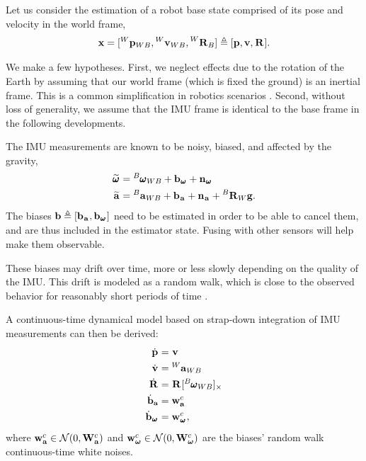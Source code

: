 Let us consider the estimation of a robot base state comprised of its pose and velocity in the world frame,
%
\begin{equation}
    {\bf x} = [\prescript{W}{}{{\bf p}}_{WB}, \prescript{W}{}{{\bf v}}_{WB}, \prescript{W}{}{{\bf R}}_{B}]
    \triangleq 
    [{\bf p}, {\bf v}, \prescript{}{}{{\bf R}}_{}].
\end{equation}

We make a few hypotheses. First, we neglect effects due to the rotation of the Earth by assuming 
that our world frame (which is fixed \wrt the ground) is an inertial frame. This is a common simplification in robotics scenarios \cite{forster2017-TRO}. 
Second, without loss of generality, we assume that the IMU frame is identical to the base frame in the following developments.

The IMU measurements are known to be noisy, biased, and affected by the gravity,
%
\begin{equation}
    \begin{split}
    \prescript{}{}{\widetilde{\pmb{\omega}}}_{} &= \prescript{B}{}{\pmb{\omega}}_{WB} + {\bf b}_{\prescript{}{}{\pmb{\omega}}_{}} + {\bf n}_{\prescript{}{}{\pmb{\omega}}_{}} 
    \\
    \prescript{}{}{\widetilde{{\bf a}}}_{}    &= \prescript{B}{}{{\bf a}}_{WB} + {\bf b}_{\prescript{}{}{{\bf a}}_{}} + {\bf n}_{\prescript{}{}{{\bf a}}_{}} + \prescript{B}{}{{\bf R}}_{W} {\bf g} .
    \end{split}
    \label{eq:imu_meas_model}
\end{equation}
%    
The biases ${\bf b} \triangleq [{\bf b}_{\prescript{}{}{{\bf a}}_{}}, {\bf b}_{\prescript{}{}{\pmb{\omega}}_{}}]$ need to be estimated in order to be able to cancel them, and are thus included in the estimator state.
Fusing with other sensors will help make them observable.

These biases may drift over time, more or less slowly depending on the quality of the IMU. This drift is modeled 
as a random walk, which is close to the observed behavior for reasonably short periods of time \cite{hussen2015low}.

A continuous-time dynamical model  based on strap-down integration of IMU measurements can then be derived:
%
\begin{align}
\begin{split}
    \dot{\prescript{}{}{{\bf p}}_{}} &= \prescript{}{}{{\bf v}}_{} \\
    \dot{\prescript{}{}{{\bf v}}_{}} &= \prescript{W}{}{{\bf a}}_{WB} \\
    \dot{\prescript{}{}{{\bf R}}_{}} &= \prescript{}{}{{\bf R}}_{} [\prescript{B}{}{\pmb{\omega}}_{WB}]_{\times} \\
    \dot{{\bf b}}_{{\bf a}} &= {\bf w}_{{\bf a}}^c \\
    \dot{{\bf b}}_{\prescript{}{}{\pmb{\omega}}_{}} &= {\bf w}_{\prescript{}{}{\pmb{\omega}}_{}}^c ,
\end{split}
\label{eq:imu_dyn_conti}
\end{align}
%
where ${\bf w}_{{\bf a}}^c \in \mathcal{N}(0,{\bf W}_{\bf a}^c)$ and ${\bf w}_{{{\bm \omega}}}^c \in \mathcal{N}(0,{\bf W}_{{\bm \omega}}^c)$ are the biases' random walk continuous-time white noises.

